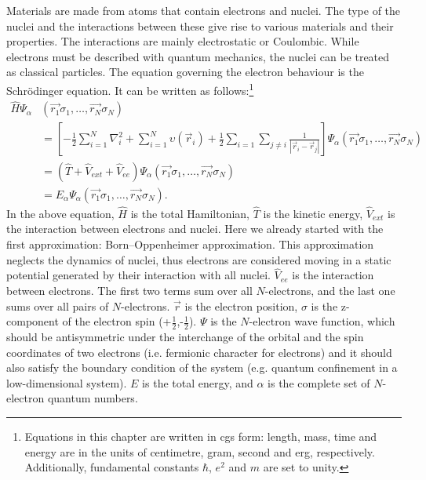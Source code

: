 %
Materials are made from atoms that contain electrons and nuclei. The type of the nuclei and the interactions between these give rise to various materials and their properties. The interactions are mainly electrostatic or Coulombic. While electrons must be described with quantum mechanics, the nuclei can be treated as classical particles. The equation governing the electron behaviour is the Schr\"{o}dinger equation. It can be written as follows:\footnote{Equations in this chapter are written in cgs form: length, mass, time and energy are in the units of centimetre, gram, second and erg, respectively. Additionally, fundamental constants $\hbar$, $e^2$ and $m$ are set to unity.}
\begin{equation}\begin{aligned}
\hat{H}\mathit{\Psi}_\alpha &(\vec{r_1}\sigma_1,\ldots,\vec{r_N}\sigma_N) \\
&=\left[ -\frac{1}{2}\sum^N_{i=1}\nabla_i^2+\sum^N_{i=1}\upsilon(\vec{r}_i)+\frac{1}{2}\sum_{i=1}\sum_{j\neq i}\frac{1}{|\vec{r}_i-\vec{r}_j|}\right]\mathit{\Psi}_\alpha(\vec{r_1}\sigma_1,\ldots,\vec{r_N}\sigma_N)  \\
&=\left( \hat{T} + \hat{V}_{ext} + \hat{V}_{ee}\right)\mathit{\Psi}_\alpha(\vec{r_1}\sigma_1,\ldots,\vec{r_N}\sigma_N) \\
&=E_\alpha\mathit{\Psi}_\alpha(\vec{r_1}\sigma_1,\ldots,\vec{r_N}\sigma_N) .
\end{aligned}\end{equation}
In the above equation, $\hat{H}$ is the total Hamiltonian, $\hat{T}$ is the kinetic energy, $\hat{V}_{ext}$ is the interaction between electrons and nuclei. Here we already started with the first approximation: Born–Oppenheimer approximation\cite{Born1927}. This approximation neglects the dynamics of nuclei, thus electrons are considered moving in a static potential generated by their interaction with all nuclei. $\hat{V}_{ee}$ is the interaction between electrons. The first two terms sum over all $N$-electrons, and the last one sums over all pairs of $N$-electrons. $\vec{r}$ is the electron position, $\sigma$ is the z-component of the electron spin (+$\frac{1}{2}$,-$\frac{1}{2}$). $\mathit{\Psi}$ is the $N$-electron wave function, which should be antisymmetric under the interchange of the orbital and the spin coordinates of two electrons (i.e. fermionic character for electrons) and it should also satisfy the boundary condition of the system (e.g. quantum confinement in a low-dimensional system). $E$ is the total energy, and $\alpha$ is the complete set of $N$-electron quantum numbers. 

